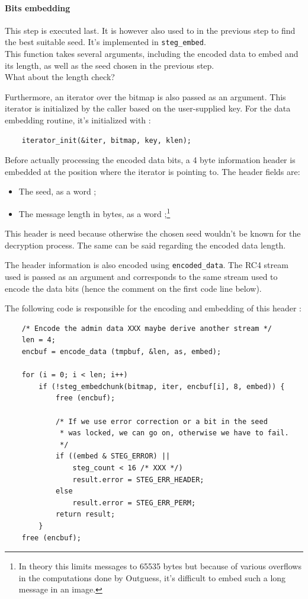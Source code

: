 \documentclass{article}
\begin{document}
\paragraph{Bits embedding} This step is executed last. It is however also used to in the previous step to find the best suitable seed. It's implemented in \texttt{steg\_embed}. \\

This function takes several arguments, including the encoded data to embed and its length, as well as the seed chosen in the previous step. \\

{\color{red} What about the length check?}

Furthermore, an iterator over the bitmap is also passed as an argument. This iterator is initialized by the caller based on the user-supplied key. For the data embedding routine, it's initialized with :
\begin{verbatim}
	iterator_init(&iter, bitmap, key, klen);
\end{verbatim}

Before actually processing the encoded data bits, a 4 byte information header is embedded at the position where the iterator is pointing to. The header fields are:
\begin{itemize}
	\item The seed, as a word ;
	\item The message length in bytes, as a word ;\footnote{In theory this limits messages to 65535 bytes but because of various overflows in the computations done by Outguess, it's difficult to embed such a long message in an image.}
\end{itemize}

This header is need because otherwise the chosen seed wouldn't be known for the decryption process. The same can be said regarding the encoded data length.

The header information is also encoded using \texttt{encoded\_data}. The RC4 stream used is passed as an argument and corresponds to the same stream used to encode the data bits (hence the comment on the first code line below).

The following code is responsible for the encoding and embedding of this header :
\begin{verbatim}
	/* Encode the admin data XXX maybe derive another stream */
	len = 4;
	encbuf = encode_data (tmpbuf, &len, as, embed);

	for (i = 0; i < len; i++)
		if (!steg_embedchunk(bitmap, iter, encbuf[i], 8, embed)) {
			free (encbuf);
	
			/* If we use error correction or a bit in the seed
			 * was locked, we can go on, otherwise we have to fail.
			 */
			if ((embed & STEG_ERROR) ||
				steg_count < 16 /* XXX */)
				result.error = STEG_ERR_HEADER;
			else
				result.error = STEG_ERR_PERM;
			return result;
		}
	free (encbuf);
\end{verbatim}
\end{document}
